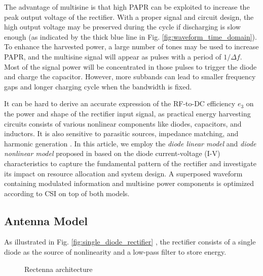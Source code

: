 The advantage of multisine is that high PAPR can be exploited to increase the peak output voltage of the rectifier. With a proper signal and circuit design, the high output voltage may be preserved during the cycle if discharging is slow enough (as indicated by the thick blue line in Fig. \ref{fig:waveform_time_domain}). To enhance the harvested power, a large number of tones may be used to increase PAPR, and the multisine signal will appear as pulses with a period of $1/\Delta f$. Most of the signal power will be concentrated in those pulses to trigger the diode and charge the capacitor. However, more subbands can lead to smaller frequency gaps and longer charging cycle when the bandwidth is fixed.

It can be hard to derive an accurate expression of the RF-to-DC efficiency ${e_3}$ on the power and shape of the rectifier input signal, as practical energy harvesting circuits consists of various nonlinear components like diodes, capacitors, and inductors. It is also sensitive to parasitic sources, impedance matching, and harmonic generation \cite{Strassner2013, Valenta2014}. In this article, we employ the \textit{diode linear model} and \textit{diode nonlinear model} proposed in \cite{Clerckx2016} based on the diode current-voltage (I-V) characteristics to capture the fundamental pattern of the rectifier and investigate its impact on resource allocation and system design. A superposed waveform containing modulated information and multisine power components is optimized according to CSI on top of both models.



\subsection{Antenna Model}\label{sec:antenna-model}

As illustrated in Fig. \ref{fig:single_diode_rectifier} \cite{Clerckx2016}, the rectifier consists of a single diode as the source of nonlinearity and a low-pass filter to store energy.

\begin{figure}[ht]
  \centering
  \caption{Rectenna architecture \cite{Clerckx2016}}
  \label{fig:rectenna_architecture}
\end{figure}

